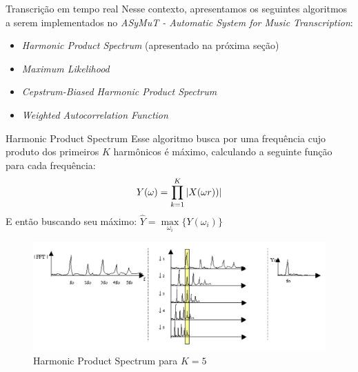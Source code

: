 \documentclass[final,hyperref={pdfpagelabels=false}]{beamer}
\begin{document}
\begin{frame}[t]
\begin{columns}[t]
\begin{column}{.465\textwidth}
\begin{block}{Transcrição em tempo real}
Nesse contexto, apresentamos os seguintes algoritmos a serem implementados no \emph{ASyMuT - Automatic System for Music Transcription}:

\begin{changemargin}{2cm}{2cm}
     \begin{itemize}
\item \emph{Harmonic Product Spectrum} (apresentado na próxima seção)
\item \emph{Maximum Likelihood}
\item \emph{Cepstrum-Biased Harmonic Product Spectrum}
\item \emph{Weighted Autocorrelation Function}
\end{itemize}
\end{changemargin}

\end{block}


\begin{block}{Harmonic Product Spectrum}
Esse algoritmo busca por uma frequência cujo produto dos primeiros $K$ harmônicos é máximo, calculando a seguinte função para cada frequência: $$Y(\omega) = \prod _{k=1}^{K} \abs{X(\omega r))}$$
E então buscando seu máximo: $\widehat{Y} = \max\limits_{\omega_i}\{Y(\omega_i)\}$

     \begin{figure}%
\centering
\includegraphics[width=0.85\linewidth]{hps2.png}
\caption{Harmonic Product Spectrum para $K=5$}
\end{figure}

\end{block}



\end{column}
\end{columns}
\end{frame}
\end{document}
